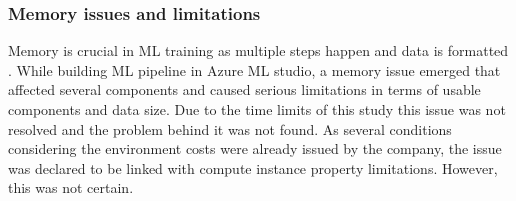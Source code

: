 %
%
%
%


\subsubsection*{Memory issues and limitations}
Memory is crucial in ML training
as multiple steps happen
and data is formatted \etc. %
While building ML pipeline in Azure ML studio,
a memory issue emerged
that affected several components
and caused serious limitations
in terms of usable components and data size.
Due to the time limits of this study
this issue was not resolved
and the problem behind it was not found.
As several conditions
considering the environment costs
were already issued by the company,
the issue was declared to be linked with
compute instance property limitations.
However, this was not certain.

